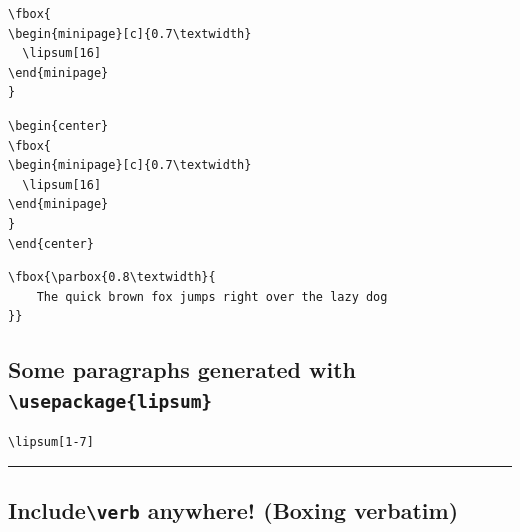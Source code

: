 \documentclass[12pt,a4paper]{article}
\theoremstyle{definition}
\theoremstyle{remark}
\begin{document}
\noindent
\begin{center}
\end{center}
 
\begin{verbatim}
\fbox{
\begin{minipage}[c]{0.7\textwidth}
  \lipsum[16]
\end{minipage}
}
\end{verbatim}
\bigskip 

\noindent
{}
\bigskip 

\begin{verbatim}
\begin{center}
\fbox{
\begin{minipage}[c]{0.7\textwidth}
  \lipsum[16]
\end{minipage}
}
\end{center}
\end{verbatim}
\bigskip 

\begin{center}
\end{center}
\bigskip 



\begin{verbatim}
\fbox{\parbox{0.8\textwidth}{
    The quick brown fox jumps right over the lazy dog
}}
\end{verbatim}
\bigskip 



\subsection{Some paragraphs generated with \texttt{\textbackslash usepackage\{lipsum\} }}

\begin{verbatim}
\lipsum[1-7]
\end{verbatim}
\hrule \bigskip 

\lipsum[1-7]

\newpage 
\cprotect\subsection{Include\verb-\verb- anywhere! (Boxing verbatim)}
\end{document}
